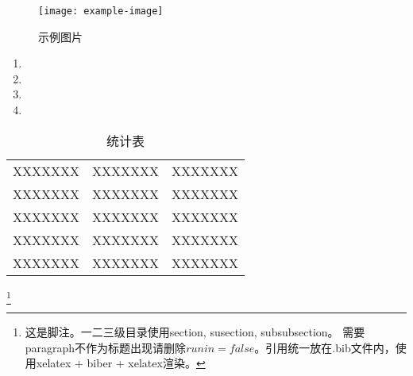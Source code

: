 \documentclass[a4paper,12pt]{article}
\begin{document}
\begin{figure}[H]
    \centering
    \texttt{[image: example-image]}  %
    \caption{示例图片}
    \label{fig:example}
\end{figure}

\begin{enumerate}
  \item 
  \item 
  \item 
  \item  
\end{enumerate}

\setlength{\tabcolsep}{0.5em}
\begin{table}[htbp]
    \centering
    \renewcommand{\arraystretch}{1.5}
    \begin{tabulary}{\textwidth}{|>{\raggedright\arraybackslash}m{0.28\textwidth}|>{\centering\arraybackslash}m{0.12\textwidth}|>{\raggedright\arraybackslash}m{0.5\textwidth}|}
    \hline
     &
     & 
     \\
    \hline
    XXXXXXX & XXXXXXX & XXXXXXX \\
    \hline
    XXXXXXX & XXXXXXX & XXXXXXX \\
    \hline
    XXXXXXX & XXXXXXX & XXXXXXX \\
    \hline
    XXXXXXX & XXXXXXX & XXXXXXX \\
    \hline
    XXXXXXX & XXXXXXX & XXXXXXX \\
    \hline
    \end{tabulary}
    \caption{统计表}
    \label{表1：统计表}
\end{table}

\footnote{这是脚注。一二三级目录使用section, susection, subsubsection。 需要paragraph不作为标题出现请删除$runin = false$。引用统一放在.bib文件内，使用xelatex + biber + xelatex渲染。}
\end{document}
